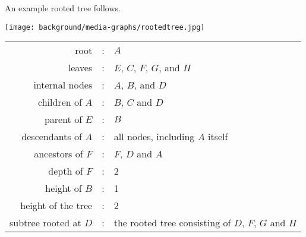 \begin{example}
\label{ex:bg::graphs::rooted-tree}
An example rooted tree follows.
\begin{center}
  \texttt{[image: background/media-graphs/rootedtree.jpg]}
\end{center}

\begin{center}
\begin{tabular}{rcl}
root & : & $A$\\
leaves & : & $E$, $C$, $F$, $G$, and $H$\\
internal nodes & : & $A$, $B$, and $D$\\
children of $A$ & : & $B$, $C$ and $D$\\
parent of $E$ & : & $B$\\
descendants of $A$ & : & all nodes, including $A$ itself\\
ancestors of $F$ & : & $F$, $D$ and $A$\\
depth of $F$ & : & 2\\
height of $B$ & : & 1\\
height of the tree & : & 2\\
subtree rooted at $D$ & : & the rooted tree consisting of $D$, $F$, $G$ and $H$
\end{tabular}
\end{center}

\end{example}



